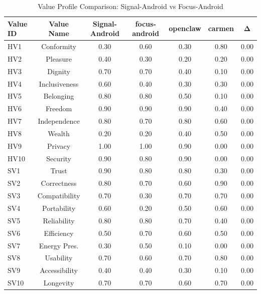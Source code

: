 \begin{table}[htbp]
\centering
\caption{Value Profile Comparison: Signal-Android vs Focus-Android}
\label{tab:profile_comparison}
\begin{tabular}{lcccccc}
\toprule
\textbf{Value ID} & \textbf{Value Name} & \textbf{Signal-Android} & \textbf{focus-android} & \textbf{openclaw} & \textbf{carmen} & \textbf{Δ} \\
\midrule
HV1 & Conformity & 0.30 & 0.60 & 0.30 & 0.80 & 0.00 \\
HV2 & Pleasure & 0.40 & 0.30 & 0.20 & 0.20 & 0.00 \\
HV3 & Dignity & 0.70 & 0.70 & 0.40 & 0.10 & 0.00 \\
HV4 & Inclusiveness & 0.60 & 0.40 & 0.30 & 0.30 & 0.00 \\
HV5 & Belonging & 0.80 & 0.80 & 0.50 & 0.10 & 0.00 \\
HV6 & Freedom & 0.90 & 0.90 & 0.90 & 0.40 & 0.00 \\
HV7 & Independence & 0.80 & 0.70 & 0.80 & 0.60 & 0.00 \\
HV8 & Wealth & 0.20 & 0.20 & 0.40 & 0.50 & 0.00 \\
HV9 & Privacy & 1.00 & 1.00 & 0.90 & 0.00 & 0.00 \\
HV10 & Security & 0.90 & 0.80 & 0.90 & 0.00 & 0.00 \\
SV1 & Trust & 0.90 & 0.80 & 0.80 & 0.30 & 0.00 \\
SV2 & Correctness & 0.80 & 0.70 & 0.60 & 0.90 & 0.00 \\
SV3 & Compatibility & 0.70 & 0.30 & 0.70 & 0.70 & 0.00 \\
SV4 & Portability & 0.60 & 0.20 & 0.50 & 0.60 & 0.00 \\
SV5 & Reliability & 0.80 & 0.80 & 0.70 & 0.40 & 0.00 \\
SV6 & Efficiency & 0.50 & 0.70 & 0.60 & 0.50 & 0.00 \\
SV7 & Energy Pres. & 0.30 & 0.50 & 0.10 & 0.00 & 0.00 \\
SV8 & Usability & 0.70 & 0.60 & 0.70 & 0.80 & 0.00 \\
SV9 & Accessibility & 0.40 & 0.40 & 0.30 & 0.10 & 0.00 \\
SV10 & Longevity & 0.70 & 0.70 & 0.60 & 0.70 & 0.00 \\
\bottomrule
\end{tabular}
\end{table}